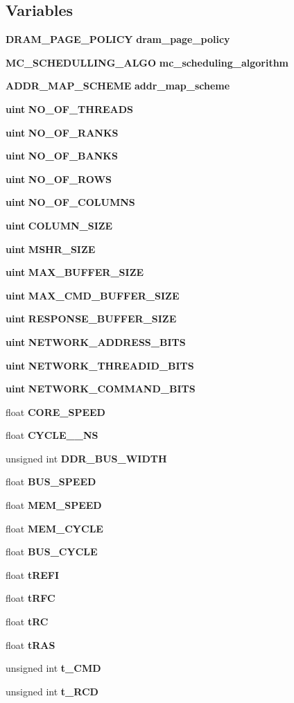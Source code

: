 \subsection*{Variables}
\begin{CompactItemize}
\item 
{\bf DRAM\_\-PAGE\_\-POLICY} {\bf dram\_\-page\_\-policy}
\item 
{\bf MC\_\-SCHEDULLING\_\-ALGO} {\bf mc\_\-scheduling\_\-algorithm}
\item 
{\bf ADDR\_\-MAP\_\-SCHEME} {\bf addr\_\-map\_\-scheme}
\item 
{\bf uint} {\bf NO\_\-OF\_\-THREADS}
\item 
{\bf uint} {\bf NO\_\-OF\_\-RANKS}
\item 
{\bf uint} {\bf NO\_\-OF\_\-BANKS}
\item 
{\bf uint} {\bf NO\_\-OF\_\-ROWS}
\item 
{\bf uint} {\bf NO\_\-OF\_\-COLUMNS}
\item 
{\bf uint} {\bf COLUMN\_\-SIZE}
\item 
{\bf uint} {\bf MSHR\_\-SIZE}
\item 
{\bf uint} {\bf MAX\_\-BUFFER\_\-SIZE}
\item 
{\bf uint} {\bf MAX\_\-CMD\_\-BUFFER\_\-SIZE}
\item 
{\bf uint} {\bf RESPONSE\_\-BUFFER\_\-SIZE}
\item 
{\bf uint} {\bf NETWORK\_\-ADDRESS\_\-BITS}
\item 
{\bf uint} {\bf NETWORK\_\-THREADID\_\-BITS}
\item 
{\bf uint} {\bf NETWORK\_\-COMMAND\_\-BITS}
\item 
float {\bf CORE\_\-SPEED}
\item 
float {\bf CYCLE\_\_\-NS}
\item 
unsigned int {\bf DDR\_\-BUS\_\-WIDTH}
\item 
float {\bf BUS\_\-SPEED}
\item 
float {\bf MEM\_\-SPEED}
\item 
float {\bf MEM\_\-CYCLE}
\item 
float {\bf BUS\_\-CYCLE}
\item 
float {\bf tREFI}
\item 
float {\bf tRFC}
\item 
float {\bf tRC}
\item 
float {\bf tRAS}
\item 
unsigned int {\bf t\_\-CMD}
\item 
unsigned int {\bf t\_\-RCD}

\end{CompactItemize}
